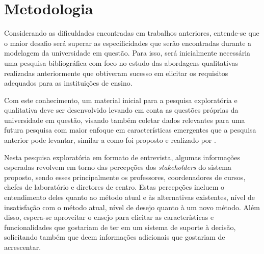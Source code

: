\section{Metodologia} %



Considerando as dificuldades encontradas em trabalhos anteriores, entende-se que o maior desafio será superar as especificidades que serão encontradas durante a modelagem da universidade em questão. Para isso, será inicialmente necessária uma pesquisa bibliográfica com foco no estudo das abordagens qualitativas realizadas anteriormente que obtiveram sucesso em elicitar os requisitos adequados para as instituições de ensino.


Com este conhecimento, um material inicial para a pesquisa exploratória e qualitativa deve ser desenvolvido levando em conta as questões próprias da universidade em questão, visando também coletar dados relevantes para uma futura pesquisa com maior enfoque em características emergentes que a pesquisa anterior pode levantar, similar a como foi proposto e realizado por \cite{andre_interaction_2018}.

Nesta pesquisa exploratória em formato de entrevista, algumas informações esperadas revolvem em torno das percepções dos \textit{stakeholders} do sistema proposto, sendo esses principalmente os professores, coordenadores de cursos, chefes de laboratório e diretores de centro. Estas percepções incluem o entendimento deles quanto ao método atual e às alternativas existentes, nível de insatisfação com o método atual, nível de desejo quanto à um novo método. Além disso, espera-se aproveitar o ensejo para elicitar as características e funcionalidades que gostariam de ter em um sistema de suporte à decisão, solicitando também que deem informações adicionais que gostariam de acrescentar.

